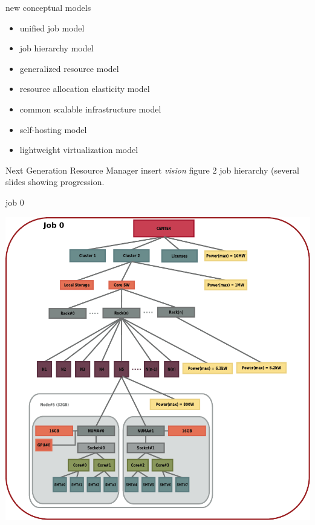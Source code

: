\documentclass[default,pdf,colorBG,slideColor]{prosper}
\begin{document}
\begin{slide}{new conceptual models}{\small
\begin{itemize}
  \item{unified job model}
  \item{job hierarchy model}
  \item{generalized resource model}
  \item{resource allocation elasticity model}
  \item{common scalable infrastructure model}
  \item{self-hosting model}
  \item{lightweight virtualization model}
\end{itemize}
}\end{slide}
\begin{slide}{Next Generation Resource Manager}{\small
insert {\em vision} figure 2 job hierarchy (several slides showing
progression.
}\end{slide}
\begin{slide}{job 0}{\small
\begin{center}
  \includegraphics[scale=0.50]{job-hierarchy-job0}
\end{center}
}\end{slide}
\end{document}
